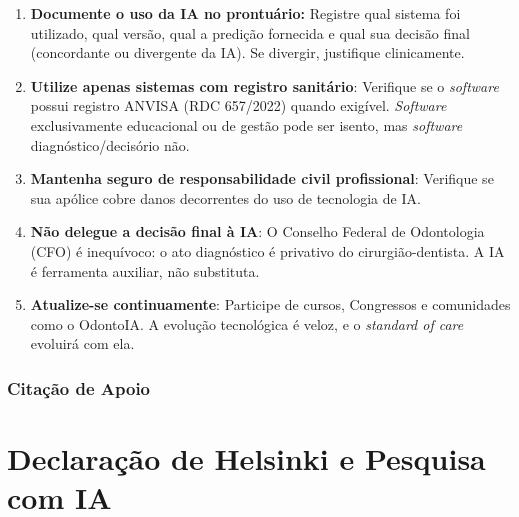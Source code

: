 \begin{enumerate}
  \item \textbf{Documente o uso da IA no prontuário:} Registre qual sistema foi
    utilizado, qual versão, qual a predição fornecida e qual sua decisão final
    (concordante ou divergente da IA). Se divergir, justifique clinicamente.

  \item \textbf{Utilize apenas sistemas com registro sanitário}: Verifique se
    o \textit{software} possui registro ANVISA (RDC 657/2022) quando exigível.
    \textit{Software} exclusivamente educacional ou de gestão pode ser isento,
    mas \textit{software} diagnóstico/decisório não.

  \item \textbf{Mantenha seguro de responsabilidade civil profissional}: Verifique
    se sua apólice cobre danos decorrentes do uso de tecnologia de IA.

  \item \textbf{Não delegue a decisão final à IA}: O Conselho Federal de
    Odontologia (CFO) é inequívoco: o ato diagnóstico é privativo do
    cirurgião-dentista. A IA é ferramenta auxiliar, não substituta.

  \item \textbf{Atualize-se continuamente}: Participe de cursos, Congressos e
    comunidades como o OdontoIA. A evolução tecnológica é veloz, e o
    \textit{standard of care} evoluirá com ela.
\end{enumerate}

\subsubsection{Citação de Apoio}



\section{Declaração de Helsinki e Pesquisa com IA}
\label{sec:helsinki-ia}

